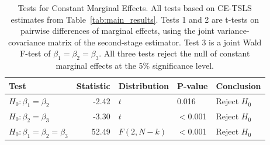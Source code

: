 \begin{table}[h!]
\centering
\caption{Tests for Constant Marginal Effects. All tests based on CE-TSLS estimates from Table~\ref{tab:main_results}. Tests 1 and 2 are t-tests on pairwise differences of marginal effects, using the joint variance-covariance matrix of the second-stage estimator. Test 3 is a joint Wald F-test of $\beta_1 = \beta_2 = \beta_3$. All three tests reject the null of constant marginal effects at the 5\% significance level.} 
\label{tab:tests}
\begingroup\small
\begin{tabular}{lrlll}
  \toprule
Test & Statistic & Distribution & P-value & Conclusion \\ 
  \midrule
$H_0: \beta_1 = \beta_2$ & -2.42 & $t$ & 0.016 & Reject $H_0$ \\ 
  $H_0: \beta_2 = \beta_3$ & -3.30 & $t$ & $<$0.001 & Reject $H_0$ \\ 
  $H_0: \beta_1 = \beta_2 = \beta_3$ & 52.49 & $F(2, N-k)$ & $<$0.001 & Reject $H_0$ \\ 
   \bottomrule
\end{tabular}
\endgroup
\end{table}
